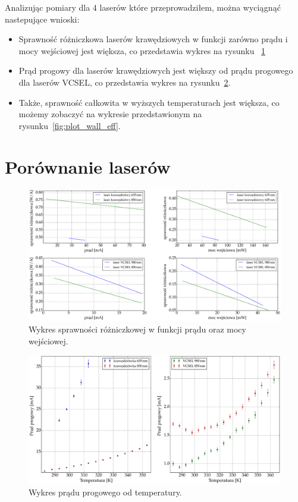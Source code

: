 Analizując pomiary dla 4 laserów które przeprowadziłem, można wyciągnąć nastepujące wnioski:
\begin{itemize}
\item Sprawność różniczkowa laserów krawędziowych w funkcji zarówno prądu i mocy wejściowej jest większa, co
przedstawia wykres na rysunku ~\ref{fig:plot_eff}
\item Prąd progowy dla laserów krawędziowych jest większy od prądu progowego dla laserów VCSEL, co przedstawia wykres
na rysunku~\ref{fig:plot_temp_i_th}.
\item Także, sprawność całkowita w wyższych temperaturach jest większa, co możemy zobaczyć na wykresie przedstawionym na
rysunku~\ref{fig:plot_wall_eff}.
\end{itemize}
\section{Porównanie laserów}
\begin{figure}
\center
  \includegraphics[scale=0.30]{plot_common/plot_eff.eps}
  \caption{Wykres sprawności różniczkowej w funkcji prądu oraz mocy wejściowej.}
  \label{fig:plot_eff}
\end{figure}
\begin{figure}
\center
  \includegraphics[scale=0.30]{plot_common/plot_temp_i_th.eps}
  \caption{Wykres prądu progowego od temperatury.}
  \label{fig:plot_temp_i_th}
\end{figure}

